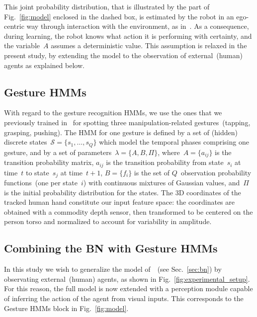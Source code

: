 This joint probability distribution, that is illustrated by the part of Fig.~\ref{fig:model} enclosed in the dashed box, is estimated by the robot in an ego-centric way through interaction with the environment, as in~\cite{salvi:2012:smcb}. As a consequence, during learning, the robot knows what action it is performing with certainty, and the variable~$A$ assumes a deterministic value. This assumption is relaxed in the present study, by extending the model to the observation of external~(human) agents as explained below.

\subsection{Gesture \aclp{HMM}}

With regard to the gesture recognition \acsp{HMM}, we use the ones that we previously trained in~\cite{saponaro:2013:crhri} for spotting three manipulation-related gestures~(tapping, grasping, pushing). The \ac{HMM} for one gesture is defined by a set of (hidden) discrete states~$\mathcal{S} = \{s_1, \dots, s_Q\}$ which model the temporal phases comprising one gesture, and by a set of parameters~$\lambda = \{ A, B, \Pi \}$, where~$A = \{ a_{ij} \}$ is the transition probability matrix, $a_{ij}$ is the transition probability from state~$s_i$ at time~$t$ to state~$s_j$ at time~$t+1$, $B = \{ f_i \}$ is the set of $Q$~observation probability functions~(one per state~$i$) with continuous mixtures of Gaussian values, and~$\Pi$ is the initial probability distribution for the states. The 3D coordinates of the tracked human hand constitute our input feature space: the coordinates are obtained with a commodity depth sensor, then transformed to be centered on the person torso and normalized to account for variability in amplitude.

\subsection{Combining the \acs{BN} with Gesture \acsp{HMM}}

In this study we wish to generalize the model of~\cite{salvi:2012:smcb}~(see Sec.~\ref{sec:bn}) by observating external~(human) agents, as shown in Fig.~\ref{fig:experimental_setup}. For this reason, the full model is now extended with a perception module capable of inferring the action of the agent from visual inputs. This corresponds to the Gesture \acp{HMM} block in Fig.~\ref{fig:model}.

